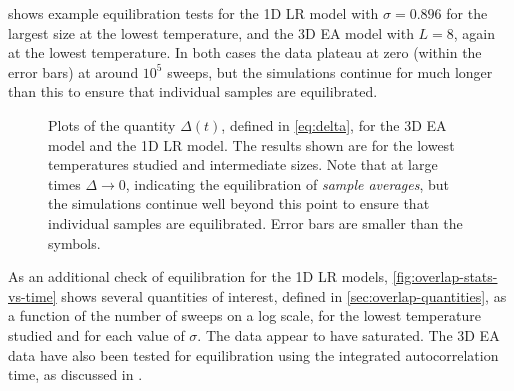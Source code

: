  shows example equilibration tests for
 the 1D LR model with $\sigma=0.896$ for the
largest size at the lowest temperature, and  the
3D EA model with $L=8$, again at the lowest temperature. In both cases the data
plateau at zero (within the error bars) at around $10^5$ sweeps, but the
simulations continue for much longer than this to ensure that individual
samples are equilibrated.

\begin{figure}
  \centering
  \begin{subfigure}{0.49\textwidth}
    \centering
    
    \label{fig:overlap-equil-1dlr}
  \end{subfigure}
  \begin{subfigure}{0.49\textwidth}
    \centering
    
    \label{fig:overlap-equil-3d}
  \end{subfigure}
  \caption[
    Example equilibration plots for the three-dimensional Edwards-Anderson
    model and the one-dimensional long-range model.
  ]
  {
    Plots of the quantity $\Delta(t)$, defined in \cref{eq:delta}, for
     the 3D EA model and
     the 1D LR model. The results shown are for
    the lowest temperatures studied and intermediate sizes. Note that at large
    times $\Delta \to 0$, indicating the equilibration of \emph{sample
      averages}, but the simulations continue well beyond this point to ensure
    that individual samples are equilibrated. Error bars are smaller than the
    symbols.
  }
  \label{fig:overlap-equil}
\end{figure}

As an additional check of equilibration for the 1D LR models,
\cref{fig:overlap-stats-vs-time} shows several quantities of interest, defined
in \cref{sec:overlap-quantities}, as a function of the number of sweeps on a
log scale, for the lowest temperature studied and for each value of $\sigma$.
The data appear to have saturated. The 3D EA data have also been tested for
equilibration using the integrated autocorrelation time, as discussed in
\textcite{yucesoy2013correlations}.

